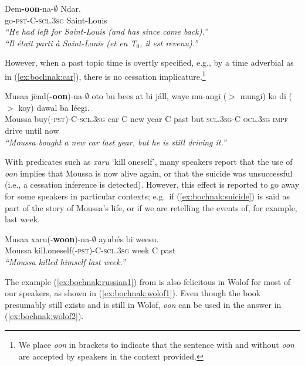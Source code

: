 \documentclass[output=paper,newtxmath,modfonts,nonflat,draftmode]{langsci/langscibook}
\begin{document}
\ea
\gll\label{leave2-rep}Dem\textbf{-oon}-na-$\emptyset$ Ndar.\\
go-\textsc{pst-C-scl.3sg} Saint-Louis\\
\glt \textit{``He had left for Saint-Louis (and has since come back).''}\\\textit{``Il \'etait parti \`a Saint-Louis (et en T$_0$,
  il est revenu).''} \hfill \citep[p.~279]{robert91approche}
\z

However, when a past topic time is overtly specified, e.g., by a time adverbial as in (\ref{ex:bochnak:car}), there is no cessation implicature.\footnote{We place \textit{oon} in brackets to indicate that the sentence with and without \textit{oon} are accepted by speakers in the context provided.}

\ea\label{ex:bochnak:car}
\gll Musaa j\"end(\textbf{-oon})-na-$\emptyset$ oto bu bees at bi j\'all, waye mu-{angi ($>$ mungi)} ko {di ($>$ koy)} dawal ba l\'eegi.\\
Moussa buy(-\textsc{pst})-C-\textsc{scl.3sg} car C new year C past but \textsc{scl.3sg}-C \textsc{ocl.3sg} \textsc{impf} drive until now\\
\glt \textit{``Moussa bought a new car last year, but he is still driving it.''} 
\z

With predicates such as \textit{xaru} `kill oneself', many speakers
report that the use of \textit{oon} implies that Moussa is now alive
again, or that the suicide was unsuccessful (i.e., a cessation
inference is detected). However, this effect is reported to go away
for some speakers in
particular contexts; e.g.~if
(\ref{ex:bochnak:suicide}) is said as part of the story of Moussa's life, or if
we are retelling the events of, for example, last week.

\ea\label{ex:bochnak:suicide}
\gll Musaa xaru(-\textbf{woon})-na-$\emptyset$ ayub\'es bi weesu.\\
Moussa kill.oneself\textsc{(-pst)-C-scl.3sg} week C past\\
\glt \textit{``Moussa killed himself last week.''}
\z

The example (\ref{ex:bochnak:russian1}) from \cite{klein94time} is also felicitous in Wolof for most
of our speakers, as shown in (\ref{ex:bochnak:wolof1}). Even though the book
presumably still exists and is still in Wolof,  \textit{oon} can be
used in the answer in (\ref{ex:bochnak:wolof2}).
\end{document}
